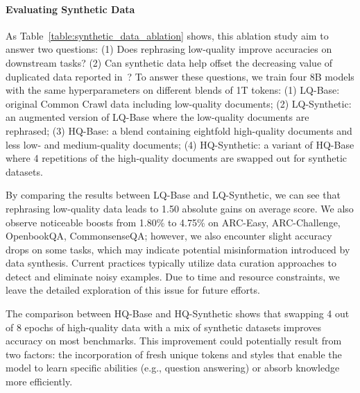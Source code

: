 \documentclass[11pt]{article}
\begin{document}
\paragraph{Evaluating Synthetic Data} 
As Table~\ref{table:synthetic_data_ablation} shows, this ablation study aim to answer two questions:
(1) Does rephrasing low-quality improve accuracies on downstream tasks?
(2) Can synthetic data help offset the decreasing value of duplicated data reported in~\citep{muennighoff2024scaling}?
To answer these questions, we train four 8B models with the same hyperparameters on different blends of 1T tokens:
(1) LQ-Base: original Common Crawl data including low-quality documents;
(2) LQ-Synthetic: an augmented version of LQ-Base where the low-quality documents are rephrased;
(3) HQ-Base: a blend containing eightfold high-quality documents and less low- and medium-quality documents;
(4) HQ-Synthetic: a variant of HQ-Base where 4 repetitions of the high-quality documents are swapped out for synthetic datasets.

By comparing the results between LQ-Base and LQ-Synthetic, we can see that rephrasing low-quality data leads to 1.50 absolute gains on average score. We also observe noticeable boosts from 1.80\% to 4.75\% on ARC-Easy, ARC-Challenge, OpenbookQA, CommonsenseQA; however, we also encounter slight accuracy drops on some tasks, which may indicate potential misinformation introduced by data synthesis.
Current practices typically utilize data curation approaches to detect and eliminate noisy examples. Due to time and resource constraints, we leave the detailed exploration of this issue for future efforts.

The comparison between HQ-Base and HQ-Synthetic shows that swapping 4 out of 8 epochs of high-quality data with a mix of synthetic datasets improves accuracy on most benchmarks.
This improvement could potentially result from two factors: the incorporation  of fresh unique tokens and styles that enable the model to learn specific abilities (e.g., question answering) or absorb knowledge more efficiently.
\end{document}
